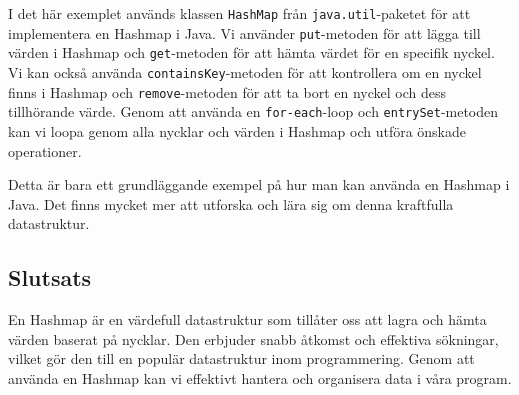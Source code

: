 \begin{Shaded}
\begin{Highlighting}[]
\OperatorTok{(}\OperatorTok{);}

         \OperatorTok{(}\OperatorTok{\textless{}}\OperatorTok{,} \OperatorTok{\textgreater{}}\OperatorTok{:}\OperatorTok{())} \OperatorTok{\{}
            \OperatorTok{=}\OperatorTok{();}
            \OperatorTok{=}\OperatorTok{();}
            \OperatorTok{(} \OperatorTok{+}\OperatorTok{+}  \OperatorTok{+}\OperatorTok{);}
        \OperatorTok{\}}
    \OperatorTok{\}}
\OperatorTok{\}}
\end{Highlighting}
\end{Shaded}

I det här exemplet används klassen \texttt{HashMap} från
\texttt{java.util}-paketet för att implementera en Hashmap i Java. Vi
använder \texttt{put}-metoden för att lägga till värden i Hashmap och
\texttt{get}-metoden för att hämta värdet för en specifik nyckel. Vi kan
också använda \texttt{containsKey}-metoden för att kontrollera om en
nyckel finns i Hashmap och \texttt{remove}-metoden för att ta bort en
nyckel och dess tillhörande värde. Genom att använda en
\texttt{for-each}-loop och \texttt{entrySet}-metoden kan vi loopa genom
alla nycklar och värden i Hashmap och utföra önskade operationer.

Detta är bara ett grundläggande exempel på hur man kan använda en
Hashmap i Java. Det finns mycket mer att utforska och lära sig om denna
kraftfulla datastruktur.

\hypertarget{slutsats}{%
\subsection{Slutsats}\label{slutsats}}

En Hashmap är en värdefull datastruktur som tillåter oss att lagra och
hämta värden baserat på nycklar. Den erbjuder snabb åtkomst och
effektiva sökningar, vilket gör den till en populär datastruktur inom
programmering. Genom att använda en Hashmap kan vi effektivt hantera och
organisera data i våra program.

